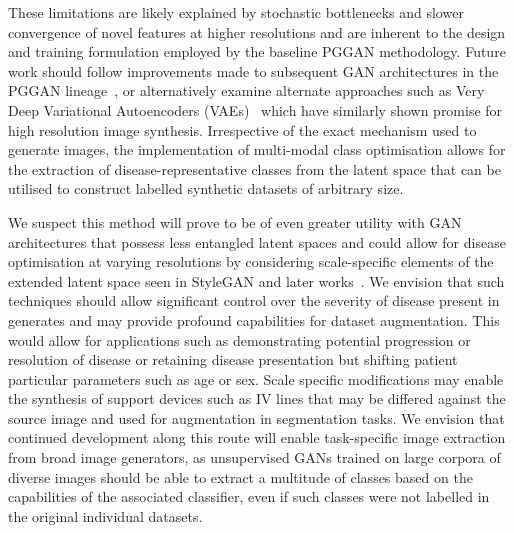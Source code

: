 \documentclass{article}
\begin{document}
These limitations are likely explained by stochastic bottlenecks and slower convergence of novel features at higher resolutions and are inherent to the design and training formulation employed by the baseline PGGAN methodology. Future work should follow improvements made to subsequent GAN architectures in the PGGAN lineage~\cite{karrasStyleBasedGeneratorArchitecture2019,karrasAnalyzingImprovingImage2020}, or alternatively examine alternate approaches such as Very Deep Variational Autoencoders (VAEs)~\cite{childVeryDeepVAEs2020} which have similarly shown promise for high resolution image synthesis. Irrespective of the exact mechanism used to generate images, the implementation of multi-modal class optimisation allows for the extraction of disease-representative classes from the latent space that can be utilised to construct labelled synthetic datasets of arbitrary size. 

We suspect this method will prove to be of even greater utility with GAN architectures that possess less entangled latent spaces and could allow for disease optimisation at varying resolutions by considering scale-specific elements of the extended latent space seen in StyleGAN and later works~\cite{karrasStyleBasedGeneratorArchitecture2019}. We envision that such techniques should allow significant control over the severity of disease present in generates and may provide profound capabilities for dataset augmentation. This would allow for applications such as demonstrating potential progression or resolution of disease or retaining disease presentation but shifting patient particular parameters such as age or sex. Scale specific modifications may enable the synthesis of support devices such as IV lines that may be differed against the source image and used for augmentation in segmentation tasks. We envision that continued development along this route will enable task-specific image extraction from broad image generators, as unsupervised GANs trained on large corpora of diverse images should be able to extract a multitude of classes based on the capabilities of the associated classifier, even if such classes were not labelled in the original individual datasets. 
\end{document}
